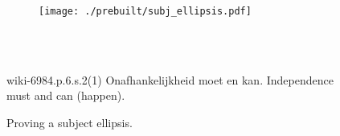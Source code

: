 \begin{figure}
	\begin{subfigure}{1\textwidth}
		\texttt{[image: ./prebuilt/subj\_ellipsis.pdf]}\\[\smallsep]
	\end{subfigure}\\[\midsep]
	\begin{subfigure}{1\textwidth}
	\end{subfigure}\\[\smallsep]
	\aethelcap
		{wiki-6984.p.6.s.2(1)}
		{Onafhankelijkheid moet en kan.}
		{Independence must and can (happen).}
		{}
	\caption{Proving a subject ellipsis.}
	\label{figure:subj_elipsis}
\end{figure}

